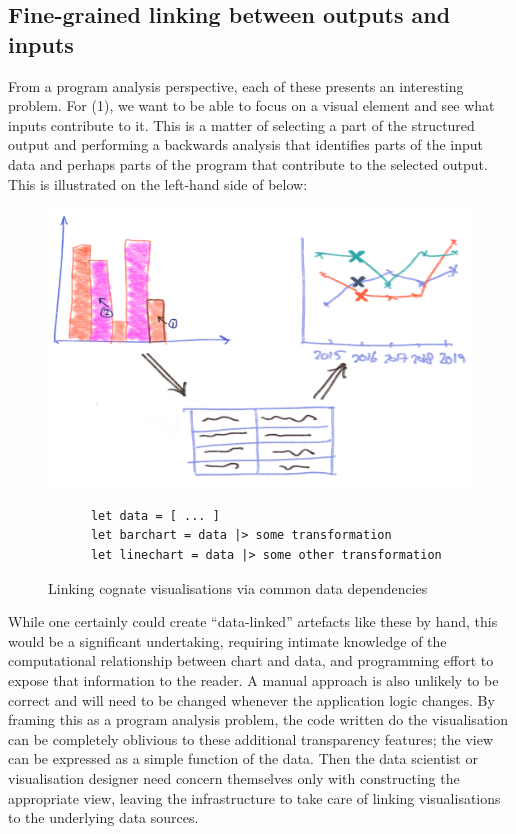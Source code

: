 \subsection{Fine-grained linking between outputs and inputs}

From a program analysis perspective, each of these presents an interesting problem. For (1), we want to be able to focus on a visual element and see what inputs contribute to it. This is a matter of selecting a part of the structured output and performing a backwards analysis that identifies parts of the input data and perhaps parts of the program that contribute to the selected output. This is illustrated on the left-hand side of  below:

\begin{figure}[H]
   {\includegraphics[scale=0.14]{fig/example/vis-linking.png}}
   \small
   \begin{lstlisting}
      let data = [ ... ]
      let barchart = data |> some transformation
      let linechart = data |> some other transformation
   \end{lstlisting}
   \caption{Linking cognate visualisations via common data dependencies}
   \label{fig:introduction:vis-linking}
\end{figure}

While one certainly could create ``data-linked'' artefacts like these by hand, this would be a significant undertaking, requiring intimate knowledge of the computational relationship between chart and data, and programming effort to expose that information to the reader. A manual approach is also unlikely to be correct and will need to be changed whenever the application logic changes. By framing this as a program analysis problem, the code written do the visualisation can be completely oblivious to these additional transparency features; the view can be expressed as a simple function of the data. Then the data scientist or visualisation designer need concern themselves only with constructing the appropriate view, leaving the infrastructure to take care of linking visualisations to the underlying data sources.

